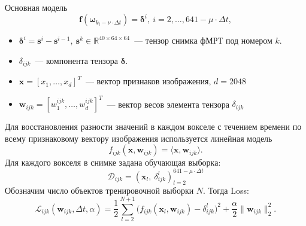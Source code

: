\documentclass[9pt,pdf]{beamer} %
\begin{document}
\begin{frame}{Основная модель}
\begin{equation}
	\label{main_model}
	\bm{f}(\bm{\omega}_{k_i - \nu \cdot \Delta t}) = \bm{\delta}^i, \ i = 2, \ldots, 641-\mu \cdot \Delta t,
\end{equation}
\begin{itemize}
    \item $\bm{\delta}^i = \bm{s}^i - \bm{s}^{i-1},~\bm{s}^k \in \mathbb{R}^{40 \times 64 \times 64}$~--- тензор снимка фМРТ под номером $k$.
    \item $\delta_{ijk}$~--- компонента тензора $\bm{\delta}$.
    \item $\bm{x} = [x_1, \ldots, x_{d}]^{T}$~--- вектор признаков изображения, $d=2048$ 
    \item $\bm{w}_{ijk} = [w^{ijk}_1, \ldots, w^{ijk}_{d}]^{T}$~--- вектор весов элемента тензора $\delta_{ijk}$
\end{itemize}
    Для восстановления разности значений в каждом вокселе с течением времени по всему признаковому вектору изображения используется линейная модель
\begin{equation}
	\label{f_ijk}
	f_{ijk}(\bm{x}, \bm{w}_{ijk}) = \langle \bm{x}, \bm{w}_{ijk} \rangle.
 \end{equation}
 Для каждого вокселя в снимке задана обучающая выборка:
\begin{equation}
    \mathcal{D}_{ijk} = \left(\bm{x}_l,~\delta^{l}_{ijk} \right)^{641 - \mu \cdot \Delta t}_{l = 2}
\end{equation}
Обозначим число объектов тренировочной выборки $N$. Тогда Loss:
\begin{equation}
	\label{Loss}
	\mathcal{L}_{ijk}(\bm{w}_{ijk}, \Delta t, \alpha) = \frac{1}{2} \sum\limits_{l = 2}^{N+1} \big(f_{ijk}(\bm{x}_l, \bm{w}_{ijk}) - \delta^{l}_{ijk}\big)^2 + \frac{\alpha}{2} \|\bm{w}_{ijk}\|^2_2.
\end{equation}
\end{frame}
\end{document}
